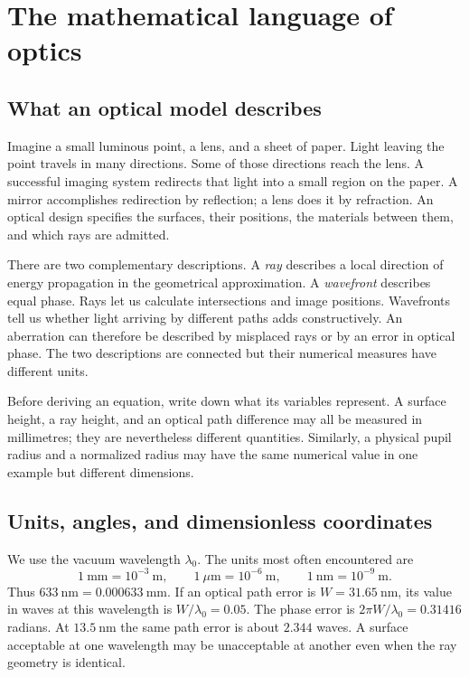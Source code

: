 \chapter{The mathematical language of optics}
\label{fnd:math}

\section{What an optical model describes}
Imagine a small luminous point, a lens, and a sheet of paper. Light leaving the point travels in many directions. Some of those directions reach the lens. A successful imaging system redirects that light into a small region on the paper. A mirror accomplishes redirection by reflection; a lens does it by refraction. An optical design specifies the surfaces, their positions, the materials between them, and which rays are admitted.

There are two complementary descriptions. A \emph{ray} describes a local direction of energy propagation in the geometrical approximation. A \emph{wavefront} describes equal phase. Rays let us calculate intersections and image positions. Wavefronts tell us whether light arriving by different paths adds constructively. An aberration can therefore be described by misplaced rays or by an error in optical phase. The two descriptions are connected but their numerical measures have different units.

Before deriving an equation, write down what its variables represent. A surface height, a ray height, and an optical path difference may all be measured in millimetres; they are nevertheless different quantities. Similarly, a physical pupil radius and a normalized radius may have the same numerical value in one example but different dimensions.

\section{Units, angles, and dimensionless coordinates}
We use the vacuum wavelength $\lambda_0$. The units most often encountered are
\[
1\ \mathrm{mm}=10^{-3}\ \mathrm{m},\qquad
1\ \mu\mathrm{m}=10^{-6}\ \mathrm{m},\qquad
1\ \mathrm{nm}=10^{-9}\ \mathrm{m}.
\]
Thus $633\ \mathrm{nm}=0.000633\ \mathrm{mm}$. If an optical path error is $W=31.65\ \mathrm{nm}$, its value in waves at this wavelength is $W/\lambda_0=0.05$. The phase error is $2\pi W/\lambda_0=0.31416$ radians. At $13.5\ \mathrm{nm}$ the same path error is about $2.344$ waves. A surface acceptable at one wavelength may be unacceptable at another even when the ray geometry is identical.

